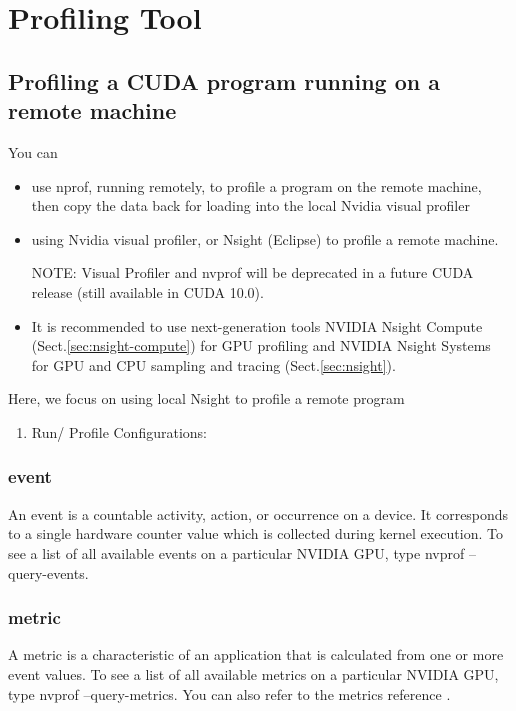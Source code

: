 
\chapter{Profiling Tool}
\label{chap:profiling-tool}


\section{Profiling a CUDA program running on a remote machine}

You can 
\begin{itemize}
  \item use nprof, running remotely, to profile a program on the remote machine, then copy the data back for loading 
  into the local Nvidia visual profiler
  
  \item using Nvidia visual profiler, or Nsight (Eclipse) to profile a remote machine. 
  
NOTE: Visual Profiler and nvprof will be deprecated in a future CUDA release
(still available in CUDA 10.0).
\item 
It is recommended to use next-generation tools NVIDIA Nsight Compute
(Sect.\ref{sec:nsight-compute}) for GPU profiling and NVIDIA Nsight Systems for
GPU and CPU sampling and tracing (Sect.\ref{sec:nsight}).

\end{itemize}

Here, we focus on using local Nsight to profile a remote program
\begin{enumerate}
  \item Run/ Profile Configurations: 
\end{enumerate}


\subsection{event}

An event is a countable activity, action, or occurrence on a device. It corresponds to a single hardware counter value which is collected during kernel execution. To see a list of all available events on a particular NVIDIA GPU, type nvprof --query-events.

\subsection{metric}

A metric is a characteristic of an application that is calculated from one or
more event values. To see a list of all available metrics on a particular NVIDIA
GPU, type nvprof --query-metrics. You can also refer to the metrics reference .


